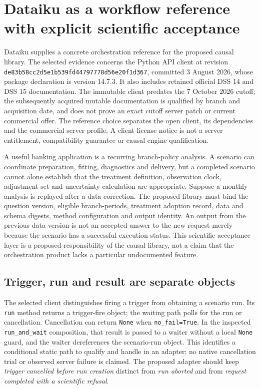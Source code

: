 \section{Dataiku as a workflow reference with explicit scientific acceptance}
\label{sec:exec25-dataiku-reuse}
Dataiku supplies a concrete orchestration reference for the proposed causal
library. The selected evidence concerns the Python API client at revision
\texttt{de83b58cc2d5e1b539fd}\allowbreak\texttt{44797778d56e20f1d367},
committed 3 August 2026, whose package declaration is version 14.7.3. It also
includes retained official DSS 14 and DSS 15 documentation. The immutable
client predates the 7 October 2026 cutoff; the subsequently acquired mutable
documentation is qualified by branch and acquisition date, and does not prove
an exact cutoff server patch or current commercial offer. The reference choice
separates the open client, its dependencies and the commercial server profile.
A client license notice is not a server entitlement, compatibility guarantee
or causal engine qualification.~\citep{exec24_workflow_contracts_dataiku,exec23_dss_dss14_flow,exec23_dss_dss14_releases,exec23_dss_latest_flow,exec23_dss_latest_releases}

A useful banking application is a recurring branch-policy analysis. A scenario
can coordinate preparation, fitting, diagnostics and delivery, but a completed
scenario cannot alone establish that the treatment definition, observation
clock, adjustment set and uncertainty calculation are appropriate. Suppose a
monthly analysis is replayed after a data correction. The proposed library
must bind the question version, eligible branch-periods, treatment adoption
record, data and schema digests, method configuration and output identity.
An output from the previous data version is not an accepted answer to the new
request merely because the scenario has a successful execution status. This
scientific acceptance layer is a proposed responsibility of the causal library,
not a claim that the orchestration product lacks a particular undocumented
feature.~\citep{exec25_dataiku_choice}

\subsection{Trigger, run and result are separate objects}
The selected client distinguishes firing a trigger from obtaining a scenario
run. Its \texttt{run} method returns a trigger-fire object; the waiting path
polls for the run or cancellation. Cancellation can return \texttt{None} when
\texttt{no\_fail=True}. In the inspected \texttt{run\_and\_wait} composition,
that result is passed to a waiter without a local \texttt{None} guard, and the
waiter dereferences the scenario-run object. This identifies a conditional
static path to qualify and handle in an adapter; no native cancellation trial
or observed server failure is claimed. The proposed adapter should keep
\emph{trigger cancelled before run creation} distinct from \emph{run aborted}
and from \emph{request completed with a scientific refusal}.~\citep{exec24_workflow_contracts_dataiku}


